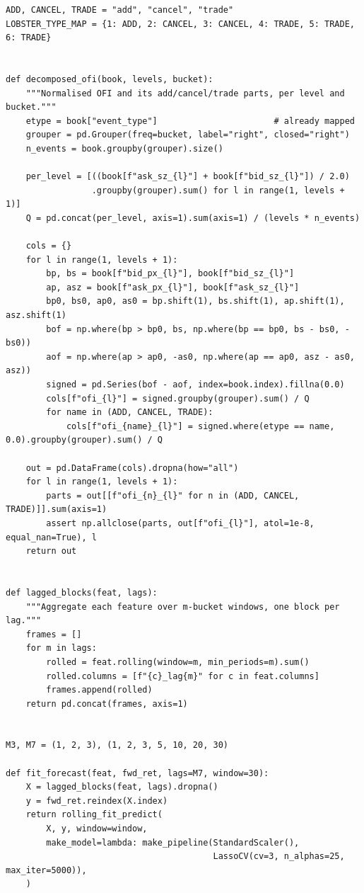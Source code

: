 \documentclass[11pt]{article}
\begin{document}
\begin{lstlisting}[caption={Decomposed OFI. The assertion enforces the additivity identity,
which is the cheapest test that the event mapping is right.}]
ADD, CANCEL, TRADE = "add", "cancel", "trade"
LOBSTER_TYPE_MAP = {1: ADD, 2: CANCEL, 3: CANCEL, 4: TRADE, 5: TRADE, 6: TRADE}


def decomposed_ofi(book, levels, bucket):
    """Normalised OFI and its add/cancel/trade parts, per level and bucket."""
    etype = book["event_type"]                       # already mapped
    grouper = pd.Grouper(freq=bucket, label="right", closed="right")
    n_events = book.groupby(grouper).size()

    per_level = [((book[f"ask_sz_{l}"] + book[f"bid_sz_{l}"]) / 2.0)
                 .groupby(grouper).sum() for l in range(1, levels + 1)]
    Q = pd.concat(per_level, axis=1).sum(axis=1) / (levels * n_events)

    cols = {}
    for l in range(1, levels + 1):
        bp, bs = book[f"bid_px_{l}"], book[f"bid_sz_{l}"]
        ap, asz = book[f"ask_px_{l}"], book[f"ask_sz_{l}"]
        bp0, bs0, ap0, as0 = bp.shift(1), bs.shift(1), ap.shift(1), asz.shift(1)
        bof = np.where(bp > bp0, bs, np.where(bp == bp0, bs - bs0, -bs0))
        aof = np.where(ap > ap0, -as0, np.where(ap == ap0, asz - as0, asz))
        signed = pd.Series(bof - aof, index=book.index).fillna(0.0)
        cols[f"ofi_{l}"] = signed.groupby(grouper).sum() / Q
        for name in (ADD, CANCEL, TRADE):
            cols[f"ofi_{name}_{l}"] = signed.where(etype == name, 0.0).groupby(grouper).sum() / Q

    out = pd.DataFrame(cols).dropna(how="all")
    for l in range(1, levels + 1):
        parts = out[[f"ofi_{n}_{l}" for n in (ADD, CANCEL, TRADE)]].sum(axis=1)
        assert np.allclose(parts, out[f"ofi_{l}"], atol=1e-8, equal_nan=True), l
    return out


def lagged_blocks(feat, lags):
    """Aggregate each feature over m-bucket windows, one block per lag."""
    frames = []
    for m in lags:
        rolled = feat.rolling(window=m, min_periods=m).sum()
        rolled.columns = [f"{c}_lag{m}" for c in feat.columns]
        frames.append(rolled)
    return pd.concat(frames, axis=1)


M3, M7 = (1, 2, 3), (1, 2, 3, 5, 10, 20, 30)

def fit_forecast(feat, fwd_ret, lags=M7, window=30):
    X = lagged_blocks(feat, lags).dropna()
    y = fwd_ret.reindex(X.index)
    return rolling_fit_predict(
        X, y, window=window,
        make_model=lambda: make_pipeline(StandardScaler(),
                                         LassoCV(cv=3, n_alphas=25, max_iter=5000)),
    )
\end{lstlisting}
\end{document}
